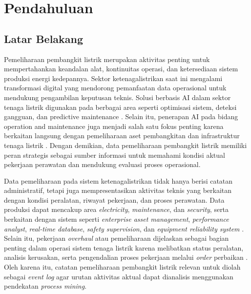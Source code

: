 \chapter{Pendahuluan}

\section{Latar Belakang}
Pemeliharaan pembangkit listrik merupakan aktivitas penting untuk mempertahankan keandalan alat, kontinuitas operasi, dan ketersediaan sistem produksi energi kedepannya. Sektor ketenagalistrikan saat ini mengalami transformasi digital yang mendorong pemanfaatan data operasional untuk mendukung pengambilan keputusan teknis. Solusi berbasis AI dalam sektor tenaga listrik digunakan pada berbagai area seperti optimisasi sistem, deteksi gangguan, dan predictive maintenance \cite{franki2023ai_power_sector}. Selain itu, penerapan AI pada bidang operation and maintenance juga menjadi salah satu fokus penting karena berkaitan langsung dengan pemeliharaan aset pembangkitan dan infrastruktur tenaga listrik \cite{franki2023ai_power_sector}. Dengan demikian, data pemeliharaan pembangkit listrik memiliki peran strategis sebagai sumber informasi untuk memahami kondisi aktual pekerjaan perawatan dan mendukung evaluasi proses operasional.

\noindent Data pemeliharaan pada sistem ketenagalistrikan tidak hanya berisi catatan administratif, tetapi juga mempresentasikan aktivitas teknis yang berkaitan dengan kondisi peralatan, riwayat pekerjaan, dan proses perawatan. Data produksi dapat mencakup area \textit{electricity}, \textit{maintenance}, dan \textit{security}, serta berkaitan dengan sistem seperti \textit{enterprise asset management}, \textit{performance analyst}, \textit{real-time database}, \textit{safety supervision}, dan \textit{equipment reliability system} \cite{ge2017electric_power_data_mining}. Selain itu, pekerjaan \textit{overhaul} atau pemeliharaan dijelaskan sebagai bagian penting dalam operasi sistem tenaga listrik karena melibatkan status peralatan, analisis kerusakan, serta pengendalian proses pekerjaan melalui \textit{order} perbaikan \cite{ge2017electric_power_data_mining}.
Oleh karena itu, catatan pemeliharaan pembangkit listrik relevan untuk diolah sebagai \textit{event log} agar urutan aktivitas aktual dapat dianalisis menggunakan pendekatan \textit{process mining}.

